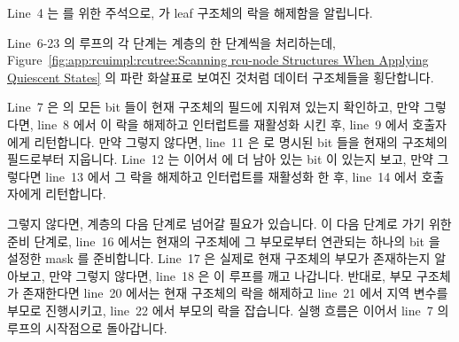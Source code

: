 Line~4 는  를 위한 주석으로,  가 leaf
 구조체의 락을 해제함을 알립니다.
\iffalse

Line~4 is annotation for the \co{sparse} utility, indicating
that \co{cpu_quiet_msk()} releases the leaf \co{rcu_node}
structure's lock.
\fi

\begin{figure*}[tb]
\centering
{}
\caption{Scanning {\tt rcu\_node} Structures When Applying Quiescent States}
\label{fig:app:rcuimpl:rcutree:Scanning rcu-node Structures When Applying Quiescent States}
\end{figure*}

Line~6-23 의 루프의 각 단계는  계층의 한 단계씩을 처리하는데,
Figure~\ref{fig:app:rcuimpl:rcutree:Scanning rcu-node Structures When Applying Quiescent States}
의 파란 화살표로 보여진 것처럼 데이터 구조체들을 횡단합니다.

Line~7 은  의 모든 bit 들이 현재  구조체의 
필드에 지워져 있는지 확인하고, 만약 그렇다면, line~8 에서 이 락을 해제하고
인터럽트를 재활성화 시킨 후, line~9 에서 호출자에게 리턴합니다.
만약 그렇지 않다면, line~11 은  로 명시된 bit 들을 현재의
 구조체의  필드로부터 지웁니다.
Line~12 는 이어서  에 더 남아 있는 bit 이 있는지 보고, 만약
그렇다면 line~13 에서 그 락을 해제하고 인터럽트를 재활성화 한 후, line~14 에서
호출자에게 리턴합니다.
\iffalse

Each pass through the loop spanning lines~6-23 does the required
processing for one level of the \co{rcu_node} hierarchy, traversing
the data structures as shown by the blue arrow in
Figure~\ref{fig:app:rcuimpl:rcutree:Scanning rcu-node Structures When Applying Quiescent States}.

Line~7 checks to see if all of the bits in \co{mask} have already
been cleared in the current \co{rcu_node} structure's \co{->qsmask}
field, and, if so, line~8 releases the lock and re-enables interrupts,
and line~9 returns to the caller.
If not, line~11 clears the bits specified by \co{mask} from the current
\co{rcu_node} structure's \co{qsmask} field.
Line~12 then checks to see if there are more bits remaining
in \co{->qsmask}, and, if so, line~13 releases the lock and re-enables
interrupts, and line~14 returns to the caller.
\fi

그렇지 않다면,  계층의 다음 단계로 넘어갈 필요가 있습니다.
이 다음 단계로 가기 위한 준비 단계로, line~16 에서는 현재의 
구조체에 그 부모로부터 연관되는 하나의 bit 을 설정한 mask 를 준비합니다.
Line~17 은 실제로 현재  구조체의 부모가 존재하는지 알아보고, 만약
그렇지 않다면, line~18 은 이 루프를 깨고 나갑니다.
반대로, 부모  구조체가 존재한다면 line~20 에서는 현재
 구조체의 락을 해제하고 line~21 에서  지역 변수를 부모로
진행시키고, line~22 에서 부모의 락을 잡습니다.
실행 흐름은 이어서 line~7 의 루프의 시작점으로 돌아갑니다.
\iffalse

